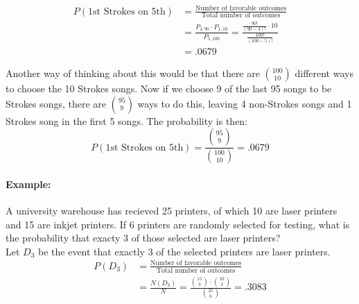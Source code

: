 \begin{align*}
    P(\text{1st Strokes on 5th}) &= \frac{\text{Number of favorable outcomes}}{\text{Total number of outcomes}} \\
    &= \frac{P_{4,90} \cdot P_{1,10}}{P_{5, 100}} = \frac{\frac{90!}{(90-4)!} \cdot 10}{\frac{100!}{(100-5)!}}\\
    &= .0679
\end{align*}

Another way of thinking about this would be that there are $\binom{100}{10}$ different ways to choose the 
10 Strokes songs. Now if we choose 9 of the last 95 songs to be Strokes songs, there are $\binom{95}{9}$ ways to do this,
 leaving 4 non-Strokes songs and 1 Strokes song in the first 5 songs. The probability is then:
\[
    P(\text{1st Strokes on 5th}) = \frac{\binom{95}{9}}{\binom{100}{10}} = .0679
\]

\paragraph*{Example:}
A university warehouse has recieved 25 printers, of which 10 are laser printers and 15 are inkjet printers.
If 6 printers are randomly selected for testing, what is the probability that exacty 3 of those selected are
laser printers?\\

Let $D_3$ be the event that exactly 3 of the selected printers are laser printers. 
\begin{align*}
    P(D_3) &= \frac{\text{Number of favorable outcomes}}{\text{Total number of outcomes}} \\
    &= \frac{N(D_3)}{N} = \frac{\binom{15}{3} \cdot \binom{10}{3}}{\binom{25}{6}} = .3083
\end{align*}
